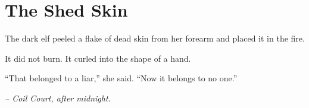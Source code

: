 \chapter*{The Shed Skin}

The dark elf peeled a flake of dead skin from her forearm and placed it in the fire.

It did not burn. It curled into the shape of a hand.

``That belonged to a liar,'' she said. ``Now it belongs to no one.''

\smallskip

\noindent \textit{-- Coil Court, after midnight.}

